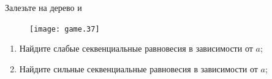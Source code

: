 \begin{problem}
\begin{source}
\cite{colell:mt}
\end{source}
Залезьте на дерево и

\begin{figure}[htbp]
     \texttt{[image: game.37]}
\end{figure}

\begin{enumerate}
\item Найдите слабые секвенциальные равновесия в зависимости от  $a$;\par
\item Найдите сильные секвенциальные равновесия в зависимости от  $a$;
\end{enumerate}


\begin{sol}

\end{sol}
\end{problem}







